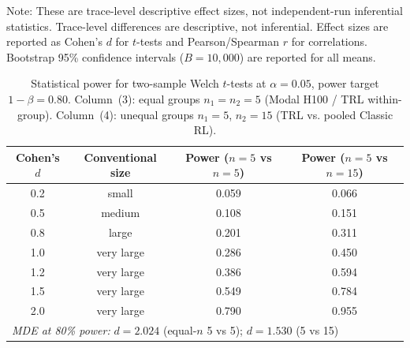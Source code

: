 \documentclass{article}
\begin{document}
Note: These are trace-level descriptive effect sizes, not independent-run inferential statistics. Trace-level differences are descriptive, not inferential.  Effect sizes are reported as Cohen's $d$ for
$t$-tests and Pearson/Spearman $r$ for correlations.  Bootstrap 95\%
confidence intervals ($B = 10{,}000$) are reported for all means.

\begin{table}[!ht]
\centering
\caption{Statistical power for two-sample Welch $t$-tests at $\alpha = 0.05$,
         power target $1{-}\beta = 0.80$.
         Column~(3): equal groups $n_1 = n_2 = 5$ (Modal H100 / TRL within-group).
         Column~(4): unequal groups $n_1 = 5$, $n_2 = 15$ (TRL vs. pooled Classic RL).}
\label{tab:power-analysis}
\small
\begin{tabular}{@{}cccc@{}}
\toprule
Cohen's $d$ & Conventional size & Power ($n{=}5$ vs $n{=}5$) & Power ($n{=}5$ vs $n{=}15$) \\
\midrule
        0.2 & small & 0.059 & 0.066 \\
        0.5 & medium & 0.108 & 0.151 \\
        0.8 & large & 0.201 & 0.311 \\
        1.0 & very large & 0.286 & 0.450 \\
        1.2 & very large & 0.386 & 0.594 \\
        1.5 & very large & 0.549 & 0.784 \\
        2.0 & very large & 0.790 & 0.955 \\
\midrule
\multicolumn{4}{l}{\textit{MDE at 80\% power:} $d = 2.024$ (equal-$n$ 5 vs 5);\; $d = 1.530$ (5 vs 15)} \\
\bottomrule
\end{tabular}
\end{table}
\end{document}
